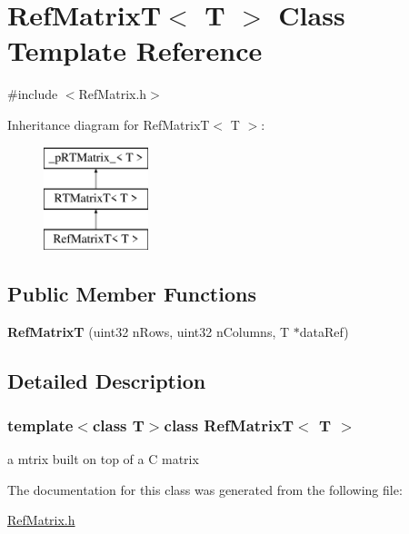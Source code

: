 \hypertarget{classRefMatrixT}{
\section{RefMatrixT$<$ T $>$ Class Template Reference}
\label{classRefMatrixT}
}


{\ttfamily \#include $<$RefMatrix.h$>$}

Inheritance diagram for RefMatrixT$<$ T $>$:\begin{figure}[H]
\begin{center}
\leavevmode
\includegraphics[height=3.000000cm]{classRefMatrixT}
\end{center}
\end{figure}
\subsection*{Public Member Functions}
\begin{DoxyCompactItemize}
\item 
\hypertarget{classRefMatrixT_a8f132026a774d0f19988a35f0869b561}{
{\bfseries RefMatrixT} (uint32 nRows, uint32 nColumns, T $\ast$dataRef)}
\label{classRefMatrixT_a8f132026a774d0f19988a35f0869b561}

\end{DoxyCompactItemize}


\subsection{Detailed Description}
\subsubsection*{template$<$class T$>$class RefMatrixT$<$ T $>$}

a mtrix built on top of a C matrix 

The documentation for this class was generated from the following file:\begin{DoxyCompactItemize}
\item 
\hyperlink{RefMatrix_8h}{RefMatrix.h}\end{DoxyCompactItemize}
